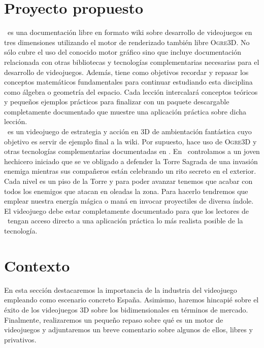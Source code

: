 \section{Proyecto propuesto}

\wiki\ es una documentación libre en formato wiki sobre desarrollo
de videojuegos en tres dimensiones utilizando el motor de renderizado
también libre \textsc{Ogre3D}. No sólo cubre el uso del conocido motor gráfico
sino que incluye documentación relacionada con otras bibliotecas y tecnologías
complementarias necesarias para el desarrollo de videojuegos. Además, tiene como objetivos
recordar y repasar los conceptos matemáticos fundamentales para continuar
estudiando esta disciplina como álgebra o geometría del espacio. Cada lección
intercalará conceptos teóricos y pequeños ejemplos prácticos para finalizar
con un paquete descargable completamente documentado que muestre una aplicación
práctica sobre dicha lección.\\

\juego\ es un videojuego de estrategia y acción en 3D de ambientación
fantástica cuyo objetivo es servir de ejemplo final a la wiki. Por supuesto,
hace uso de \textsc{Ogre3D} y otras tecnologías complementarias documentadas
en \wiki. En \juego\ controlamos a un joven hechicero iniciado que se ve obligado
a defender la Torre Sagrada de una invasión enemiga mientras sus compañeros
están celebrando un rito secreto en el exterior. Cada nivel es un piso
de la Torre y para poder avanzar tenemos que acabar con todos los enemigos
que atacan en oleadas la zona. Para hacerlo tendremos que emplear nuestra
energía mágica o maná en invocar proyectiles de diversa índole.
El videojuego debe estar completamente documentado para que los lectores
de \wiki\ tengan acceso directo a una aplicación práctica lo más realista posible
de la tecnología.\\


\section{Contexto}

En esta sección destacaremos la importancia de la industria del videojuego
empleando como escenario concreto España. Asimismo, haremos hincapié sobre
el éxito de los videojuegos 3D sobre los bidimensionales en términos de
mercado. Finalmente, realizaremos un pequeño repaso sobre qué es un motor
de videojuegos y adjuntaremos un breve comentario sobre algunos de ellos,
libres y privativos.\\

